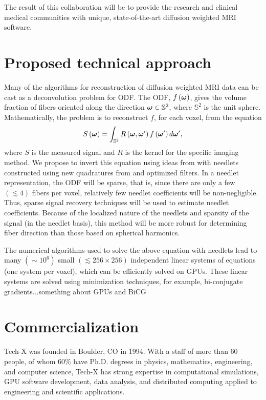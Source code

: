 \documentclass[10pt]{article}
\begin{document}
The result of this collaboration will be to provide the research and clinical
medical communities with unique, state-of-the-art diffusion weighted MRI
software.

\section*{Proposed technical approach}
Many of the algorithms for reconstruction of diffusion weighted MRI data can be
cast as a deconvolution problem for ODF\cite{JIA-VEM-2007}. The ODF, $f\left({\boldsymbol{\omega}}\right)$, gives the volume
fraction of fibers oriented along the direction ${\boldsymbol{\omega}}\in\mathbb{S}^2$, where
$\mathbb{S}^2$ is the unit sphere. Mathematically, the problem is to
reconstruct $f$, for each voxel, from the equation
\begin{equation*}
  S\left({\boldsymbol{\omega}}\right) = \int_{\mathbb{S}^2} R\left({\boldsymbol{\omega}},{\boldsymbol{\omega}}'\right)
  f\left({\boldsymbol{\omega}}'\right)d{\boldsymbol{\omega}}', 
\end{equation*}  
where $S$ is the measured signal and $R$ is the kernel for the specific imaging
method. We propose to invert this equation using ideas from
\cite{KE-NG-PI-2009} with needlets constructed using new quadratures from
\cite{AHR-BEY-2009} and optimized filters. In a needlet representation, the ODF
will be sparse, that is, since there are only a few $(\lesssim 4)$ fibers per
voxel, relatively few needlet coefficients will be non-negligible. Thus, sparse
signal recovery techniques will be used to estimate needlet
coefficients. Because of the localized nature of the needlets and sparsity of
the signal (in the needlet basis), this method will be more robust for
determining fiber direction than those based on spherical harmonics.

The numerical algorithms used to solve the above equation with needlets lead to many $(\sim 10^6)$ small $(\lesssim 256\times256)$ independent linear systems of equations (one system per voxel), which can be efficiently solved on GPUs. These linear systems are solved using minimization techniques, for example, bi-conjugate gradients...something about GPUs and BiCG

\section*{Commercialization}
Tech-X was founded in Boulder, CO in 1994. With a staff of more than 60 people, of whom 60\% have Ph.D. degrees in physics, mathematics, engineering, and computer science, Tech-X has strong expertise in computational simulations, GPU software development, data analysis, and distributed computing applied to engineering and scientific applications. 
\end{document}
